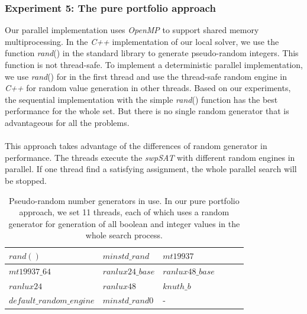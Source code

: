 \documentclass[12pt,a4paper,twoside]{scrartcl}
\numberwithin{equation}{section}
\begin{document}
  \subsubsection{Experiment 5: The pure portfolio approach} 
  \label{sec:Experiment 5}
Our parallel implementation uses \emph{OpenMP} to support shared memory multiprocessing. In the \emph{C++} implementation of our local solver, we use the function \emph{rand}() in the standard library to generate pseudo-random integers. This function is not thread-safe. To implement a deterministic parallel implementation, we use \emph{rand}()  for in the first thread and use the thread-safe random engine in \emph{C++} for random value generation in other threads. Based on our experiments, the sequential implementation with the simple \emph{rand}() function has the best performance for the whole set. But there is no single random generator that is advantageous for all the problems.\\
\\
 This approach takes advantage of the differences of random generator in performance. The threads execute the \emph{swpSAT} with different random engines in parallel. If one thread find a satisfying assignment, the whole parallel search will be stopped.\\
\begin{table}[h!]
\begin{center}
    \begin{tabular}{|l|l|l|l|l|p{1cm}|}
\hline 
$rand()$&$minstd\_rand$&$mt19937$\\ \hline
$mt19937\_64$&$ranlux24\_base$&$ranlux48\_base$\\ \hline
$ranlux24$&$ranlux48$&$knuth\_b$\\ \hline
$default\_random\_engine$&$minstd\_rand0$&-\\ \hline
\end{tabular}
\end{center}
\caption{Pseudo-random number generators in use. In our pure portfolio approach, we set 11 threads, each of which uses a random generator for generation of all boolean and integer values in the whole search process.}
\end{table} 
\end{document}
